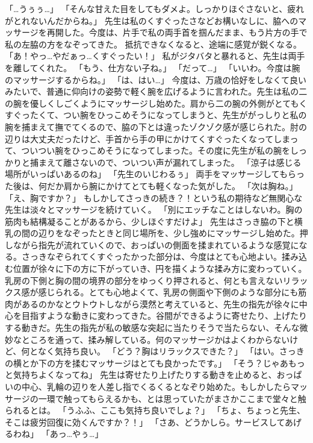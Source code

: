 「…うぅぅ…」
「そんな甘えた目をしてもダメよ。しっかりほぐさないと、疲れがとれないんだからね。」
先生は私のくすぐったさなどお構いなしに、脇へのマッサージを再開した。今度は、片手で私の両手首を掴んだまま、もう片方の手で私の左脇の方をなぞってきた。
抵抗できなくなると、途端に感覚が鋭くなる。
「あ！やっ…やだぁっ…くすぐったい！」
私がジタバタと暴れると、先生は両手を離してくれた。
「もう、仕方ない子ね。」
「だって…」
「いいわ。今度は腕のマッサージするからね。」
「は、はい…」
今度は、万歳の恰好をしなくて良いみたいで、普通に仰向けの姿勢で軽く腕を広げるように言われた。先生は私の二の腕を優しくしごくようにマッサージし始めた。肩から二の腕の外側がとてもくすぐったくて、つい腕をひっこめそうになってしまうと、先生ががっしりと私の腕を捕まえて撫でてくるので、脇の下とは違ったゾクゾク感が感じられた。肘の辺りは大丈夫だったけど、手首から手の甲にかけてくすぐったくなってしまって、ついつい腕をひっこめそうになってしまった。その度に先生が私の腕をしっかりと捕まえて離さないので、ついつい声が漏れてしまった。
「涼子は感じる場所がいっぱいあるのね」
「先生のいじわるぅ」
両手をマッサージしてもらった後は、何だか肩から腕にかけてとても軽くなった気がした。
「次は胸ね。」
「え、胸ですか？」
もしかしてさっきの続き？！という私の期待など無関心な先生は淡々とマッサージを続けていく。
「別にエッチなことはしないわ。胸の筋肉も結構凝ることがあるから、少しほぐすだけよ」
先生はさっき脇の下と横乳の間の辺りをなぞったときと同じ場所を、少し強めにマッサージし始めた。押しながら指先が流れていくので、おっぱいの側面を揉まれているような感覚になる。さっきなぞられてくすぐったかった部分は、今度はとても心地よい。揉み込む位置が徐々に下の方に下がっていき、円を描くような揉み方に変わっていく。乳房の下側と胸の間の境界の部分をゆっくり押されると、何とも言えないリラックス感が感じられる。とても心地よくて、乳房の側面や下側のような部分にも筋肉があるのかなとウトウトしながら漠然と考えていると、先生の指先が徐々に中心を目指すような動きに変わってきた。谷間ができるように寄せたり、上げたりする動きだ。先生の指先が私の敏感な突起に当たりそうで当たらない、そんな微妙なところを通って、揉み解している。何のマッサージかはよくわからないけど、何となく気持ち良い。
「どう？胸はリラックスできた？」
「はい。さっきの横とか下の方を揉むマッサージはとても良かったです。」
「そう？じゃあもっと気持ちよくなってね」
先生は寄せたり上げたりする動きを止めると、おっぱいの中心、乳輪の辺りを人差し指でくるくるとなぞり始めた。もしかしたらマッサージの一環で触ってもらえるかも、とは思っていたがまさかここまで堂々と触られるとは。
「うふふ、ここも気持ち良いでしょ？」
「ちょ、ちょっと先生、そこは疲労回復に効くんですか？！」
「さあ、どうかしら。サービスしてあげるわね」
「あっ…やぅ…」
